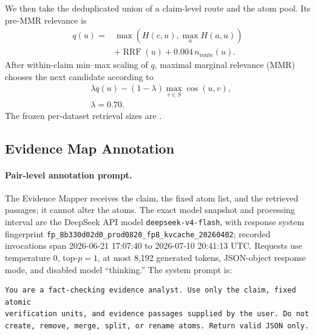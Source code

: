 We then take the deduplicated union of a claim-level route and the atom pool.
Its pre-MMR relevance is
\begin{equation}
\begin{aligned}
q(u)={}&\max\!\left(H(c,u),\max_a H(a,u)\right)\\
&+\operatorname{RRF}(u)+0.004\,n_{\mathrm{route}}(u).
\end{aligned}
\label{eq:supp-union-relevance}
\end{equation}
After within-claim min--max scaling of \(q\), maximal marginal relevance
(MMR)~\citep{Goldstein1998MMR} chooses the next candidate according to
\begin{equation}
\begin{aligned}
&\lambda q(u)
-(1-\lambda)\max_{v\in S}\operatorname{cos}(u,v),\\
&\lambda=0.70.
\end{aligned}
\label{eq:supp-mmr}
\end{equation}
The frozen per-dataset retrieval sizes are
.

\subsection{Evidence Map Annotation}
\label{supp:evidence-map}

\paragraph{Pair-level annotation prompt.}
The Evidence Mapper receives the claim, the fixed atom list, and the retrieved
passages; it cannot alter the atoms.  The exact model snapshot and processing
interval are the DeepSeek API model \texttt{deepseek-v4-flash}, with response
system fingerprint
\texttt{fp\_8b330d02d0\_prod0820\_fp8\_kvcache\_20260402}; recorded
invocations span 2026-06-21 17:07:40 to 2026-07-10 20:41:13 UTC.  Requests use
temperature \(0\), top-\(p=1\), at
most 8,192 generated tokens, JSON-object response mode, and disabled model
``thinking.''  The system prompt is:

\begin{lstlisting}
You are a fact-checking evidence analyst. Use only the claim, fixed atomic
verification units, and evidence passages supplied by the user. Do not
create, remove, merge, split, or rename atoms. Return valid JSON only.
\end{lstlisting}

